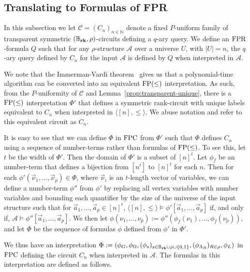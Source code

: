 \documentclass[../paper.tex]{subfiles}
\begin{document}
\subsection{Translating to Formulas of FPR}
\label{sec:translating-formulas-to-FPR}
In this subsection we let $\mathcal{C} = (C_n)_{n \in \mathbb{N}}$ denote a
fixed $P$-uniform family of transparent symmetric $(\mathbb{B}_{\text{\textbf{rk}}}, \rho)$-circuits
defining a $q$-ary query. We define an $\text{\upshape FPR}$-formula $Q$ such that for any
$\rho$-structure $\mathcal{A}$ over a universe $U$, with $\vert U \vert = n$,
the $q$-ary query defined by $C_n$ for the input $\mathcal{A}$ is defined by $Q$
when interpreted in $\mathcal{A}$.

We note that the Immerman-Vardi theorem~\cite{Immerman198686, Vardi:1982} gives
us that a polynomial-time algorithm can be converted into an equivalent
$\text{\upshape FP}(\leq)$ interpretation. As such, from the $P$-uniformity of $\mathcal{C}$
and Lemma~\ref{prop:transparent-unique}, there is a $\text{\upshape FP}(\leq)$ interpretation
$\Phi'$ that defines a symmetric rank-circuit with unique labels equivalent to
$C_n$ when interpreted in $\langle [n], \leq \rangle$. We abuse notation and
refer to this equivalent circuit as $C_n$.

It is easy to see that we can define $\Phi$ in $\text{\upshape FPC}$ from $\Phi'$ such that
$\Phi$ defines $C_n$ using a sequence of number-terms rather than formulas of
$\text{\upshape FP}(\leq)$. To see this, let $t$ be the width of $\Phi'$. Then the domain of
$\Phi'$ is a subset of $[n]^t$. Let $\phi_f$ be an number-term that defines a
bijection from $[n^t]$ to $[n]^t$ for each $n$. Then for each $\phi'
(\vec{\nu}_1, \ldots, \vec{\nu}_{p}) \in \Phi$, where $\vec{\nu}_i$ is an
$t$-length vector of variables, we can define a number-term $\phi''$ from
$\phi'$ by replacing all vertex variables with number variables and bounding
each quantifier by the size of the universe of the input structure such that for
$\vec{a}_1, \ldots, \vec{a}_p \in [n]^t$, $\langle [n], \leq \rangle \models
\phi' [\vec{a}_1, \ldots, \vec{a}_p]$ if, and only if, $\mathcal{A} \models
\phi'' [\vec{a}_1, \ldots, \vec{a}_p]$. We then let $\phi(\nu_1, \ldots, \nu_p)
:= \phi''(\phi_f (\nu_1), \ldots, \phi_f(\nu_p))$, and let $\Phi$ be the
sequence of formulas $\phi$ defined from $\phi'$ in $\Phi'$.

We thus have an interpretation $\Phi := (\phi_G, \phi_\Omega, (\phi_s)_{ s \in
  \mathbb{B}_{\text{\textbf{rk}}} \cup \rho \cup \{0,1\}}, (\phi_{\Lambda_R})_{R \in \rho}, \phi_L)$ in
$\text{\upshape FPC}$ defining the circuit $C_n$ when interpreted in $\mathcal{A}$. The
formulas in this interpretation are defined as follows.
\end{document}
